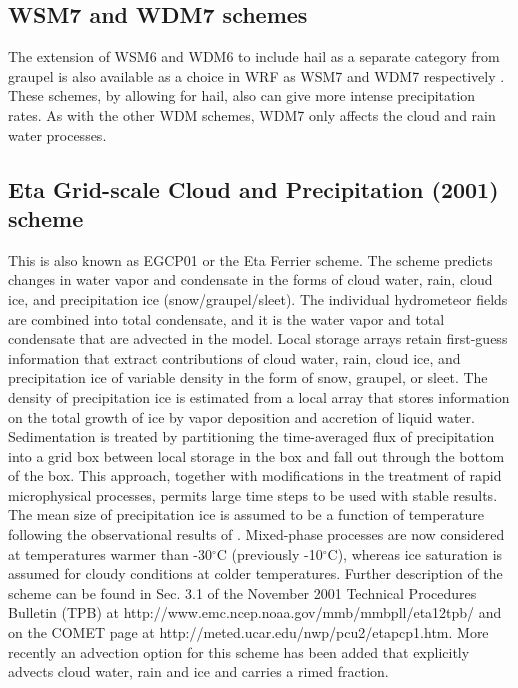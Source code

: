 \subsection{WSM7 and WDM7 schemes}

The extension of WSM6 and WDM6 to include hail as a separate category from graupel is also available as a choice in WRF as WSM7 and WDM7 respectively \citep{bae18}. 
These schemes, by allowing for hail, also can give more intense precipitation rates. As with the other WDM schemes, WDM7 only affects the cloud and rain water processes.

\subsection{Eta Grid-scale Cloud and Precipitation (2001) scheme}

This is also known as EGCP01 or the Eta Ferrier scheme. The scheme predicts changes 
in water vapor and condensate in the forms of cloud water, rain, cloud 
ice, and precipitation ice (snow/graupel/sleet).  The individual hydrometeor 
fields are combined into total condensate, and it is the water vapor 
and total condensate that are advected in the model. 
Local storage arrays retain first-guess information that extract 
contributions of cloud water, rain, cloud ice, and precipitation ice of 
variable density in the form of snow, graupel, or sleet. The density of 
precipitation ice is estimated from a local array that stores information 
on the total growth of ice by vapor deposition and accretion of liquid water. 
Sedimentation is treated by partitioning the time-averaged flux of 
precipitation into a grid box between local storage in the box and 
fall out through the bottom of the box. This approach, together with 
modifications in the treatment of rapid microphysical processes, permits 
large time steps to be used with stable results. The mean size of 
precipitation ice is assumed to be a function of temperature following 
the observational results of \citet{ryan96}. Mixed-phase processes are 
now considered at temperatures warmer than -30$^\circ$C (previously 
-10$^\circ$C), 
whereas ice saturation 
is assumed for cloudy conditions at colder temperatures. Further 
description of the scheme can be found in Sec. 3.1 of the November 
2001 Technical Procedures Bulletin (TPB) at 
http://www.emc.ncep.noaa.gov/mmb/mmbpll/eta12tpb/ and 
on the COMET page at http://meted.ucar.edu/nwp/pcu2/etapcp1.htm. 
More recently an advection option for this scheme has been added that explicitly advects cloud water, rain and ice
and carries a rimed fraction.

